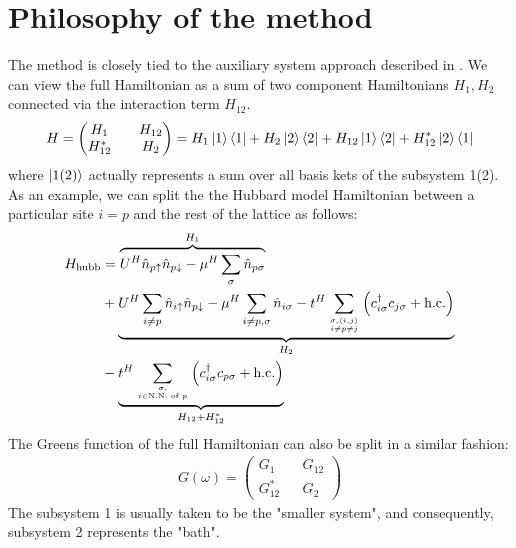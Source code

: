 \documentclass[12pt]{article}
\numberwithin{equation}{section}
\begin{document}
\section{Philosophy of the method}
The method is closely tied to the auxiliary system approach described in \cite{martin_2016}. We can view the full Hamiltonian as a sum of two component Hamiltonians \(H_1, H_2\) connected via the interaction term \(H_{12}\).
\begin{equation}\begin{aligned}
	H = \begin{pmatrix} H_1 && H_{12} \\ H_{12}^* && H_2 \end{pmatrix} = H_1 \ket{1}\bra{1} + H_2\ket{2}\bra{2} + H_{12}\ket{1}\bra{2} + H_{12}^*\ket{2}\bra{1}
\end{aligned}\end{equation}
where \(\ket{1(2)}\) actually represents a sum over all basis kets of the subsystem 1(2). As an example, we can split the the Hubbard model Hamiltonian between a particular site \(i = p\) and the rest of the lattice as follows:
\begin{equation}\begin{aligned}
	H_\text{hubb} &= \overbrace{U^H\hat n_{p \uparrow} \hat n_{p \downarrow} - \mu^H \sum_\sigma \hat n_{p \sigma}}^{H_1} \\
		      &+ \underbrace{U^H\sum_{i \neq p}\hat n_{i \uparrow} \hat n_{p \downarrow} - \mu^H \sum_{i \neq p, \sigma} \hat n_{i \sigma} -t^H\sum_{\sigma,\left<i,j \right>\atop{i \neq p \neq j}}\left(c^\dagger_{i\sigma} c_{j\sigma} + \text{h.c.}\right)}_{H_2}\\
		      & -\underbrace{t^H\sum_{\sigma,\atop{i \in \text{N.N. of }p}}\left(c^\dagger_{i\sigma} c_{p\sigma} + \text{h.c.}\right)}_{H_{12} + H_{12}^*}\\
\end{aligned}\end{equation}
The Greens function of the full Hamiltonian can also be split in a similar fashion:
\begin{equation}\begin{aligned}
	G(\omega) = \begin{pmatrix} G_1 && G_{12} \\ G_{12}^* && G_2 \end{pmatrix} 
\end{aligned}\end{equation}
The subsystem 1 is usually taken to be the "smaller system", and consequently, subsystem 2 represents the "bath".
\end{document}
